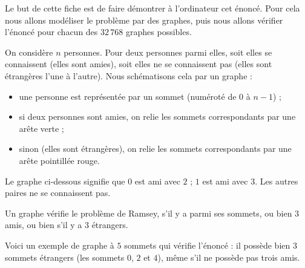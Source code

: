 \documentclass[11pt,class=report,crop=false]{standalone}
\begin{document}
\begin{cours}


Le but de cette fiche est de faire démontrer à l'ordinateur cet énoncé. Pour cela nous allons modéliser le problème par des graphes, puis nous allons vérifier l'énoncé pour chacun des $32\,768$ graphes possibles.

\bigskip 

On considère $n$ personnes. Pour deux personnes parmi elles, soit elles se connaissent (elles sont amies), soit elles ne se connaissent pas (elles sont étrangères l'une à l'autre). Nous schématisons cela par un graphe :
\begin{itemize}
  \item une personne est représentée par un sommet (numéroté de $0$ à $n-1$) ;
  \item si deux personnes sont amies, on relie les sommets correspondants par une arête verte ;
  \item sinon (elles sont étrangères), on relie les sommets correspondants par une arête pointillée rouge. 
\end{itemize}

Le graphe ci-dessous signifie que $0$ est ami avec $2$ ; $1$ est ami avec $3$. Les autres paires ne se connaissent pas.

Un graphe vérifie le problème de Ramsey, s'il y a parmi ses sommets, ou bien $3$ amis, ou bien s'il y a $3$ étrangers.

Voici un exemple de graphe à $5$ sommets qui vérifie l'énoncé : il possède bien $3$ sommets étrangers (les sommets $0$, $2$ et $4$), même s'il ne possède pas trois amis.

\end{cours}
\end{document}
